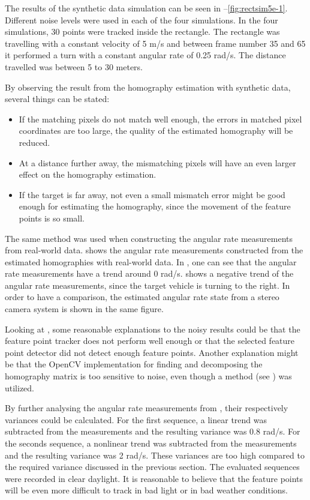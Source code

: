 The results of the synthetic data simulation can be seen in --\ref{fig:rectsim5e-1}.
Different noise levels were used in each of the four simulations.
In the four simulations, 30 points were tracked inside the rectangle.
The rectangle was travelling with a constant velocity of 5 m/s and between frame number 35 and 65 it performed a turn with a constant angular rate of 0.25 rad/s.
The distance travelled was between 5 to 30 meters.

By observing the result from the homography estimation with synthetic data, several things can be stated:
\begin{itemize}
	\item If the matching pixels do not match well enough, \ie the errors in matched pixel coordinates are too large, the quality of the estimated homography will be reduced.
	\item At a distance further away, the mismatching pixels will have an even larger effect on the homography estimation.
	\item If the target is far away, not even a small mismatch error might be good enough for estimating the homography, since the movement of the feature points is so small.
\end{itemize}

The same method was used when constructing the angular rate measurements from real-world data.
 shows the angular rate measurements constructed from the estimated homographies with real-world data.
In , one can see that the angular rate measurements have a trend around 0 rad/s.
 shows a negative trend of the angular rate measurements, since the target vehicle is turning to the right.
In order to have a comparison, the estimated angular rate state from a stereo camera system is shown in the same figure.

Looking at , some reasonable explanations to the noisy results could be that the feature point tracker does not perform well enough or that the selected feature point detector did not detect enough feature points.
Another explanation might be that the OpenCV implementation for finding and decomposing the homography matrix is too sensitive to noise, even though a \abbrRANSAC method (see ) was utilized.

By further analysing the angular rate measurements from , their respectively variances could be calculated.
For the first sequence, a linear trend was subtracted from the measurements and the resulting variance was 0.8 rad/s.
For the seconds sequence, a nonlinear trend was subtracted from the measurements and the resulting variance was 2 rad/s.
These variances are too high compared to the required variance discussed in the previous section.
The evaluated sequences were recorded in clear daylight.
It is reasonable to believe that the feature points will be even more difficult to track in bad light or in bad weather conditions.

